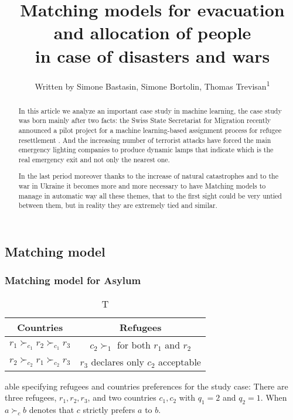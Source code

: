 \documentclass[letterpaper]{article} %
\title{Matching models for evacuation and allocation of people\\in case of disasters and wars}
\author{
    Written by Simone Bastasin, Simone Bortolin, Thomas Trevisan\textsuperscript{\rm 1}
    \\
}
\begin{document}
\maketitle

\begin{abstract}
    In this article we analyze an important case study in machine learning, the case study was born mainly after two facts:
    the Swiss State Secretariat for Migration recently announced a pilot project for a machine
    learning-based assignment process for refugee resettlement \cite{olbergml}. 
    And the increasing number of terrorist attacks have forced the main emergency lighting companies to produce dynamic lamps 
    that indicate which is the real emergency exit and not only the nearest one.

    In the last period moreover thanks to the increase of natural catastrophes and to the war in Ukraine it becomes more and more 
    necessary to have Matching models to manage in automatic way all these themes, that to the first sight could be very untied 
    between them, but in reality they are extremely tied and similar.
\end{abstract}

\noindent \cite{olbergml} \cite{basshuysen} \cite{delacretaz} \cite{andersson} 

\subsection{Matching model}

\cite{olbergml} \cite{basshuysen} \cite{delacretaz} 

\subsubsection{Matching model for Asylum}

\cite{olbergml} \cite{basshuysen} \cite{delacretaz}


\begin{table}[!htb]
    \begin{tabular}{c|c}
        \hline Countries & Refugees \\
        \hline\( r_{1} \succ_{c_{1}} r_{2} \succ_{c_{1}} r_{3} \) & \( c_{2} \succ_{1} \) for both \( r_{1} \) and \( r_{2} \) \\
        \( r_{2} \succ_{c_{2}} r_{1} \succ_{c_{2}} r_{3} \) & \( r_{3} \) declares only \( c_{2} \) acceptable \\
        \hline
    \end{tabular}
    \caption Table specifying refugees and countries preferences for
    the study case: There are three refugees, \( r _ { 1 } , r _ { 2 } , r _ { 3 } \), and two countries \( c _ { 1 } , c _ { 2 } \) with \( q _ { 1 } = 2 \) and \( q _ { 2 } = 1 \).
    When \( a \succ_{c} b \) denotes that \( c \) strictly prefers \( a \) to \( b \).
    \label{tab:countries-refugees}
\end{table}
\end{document}

